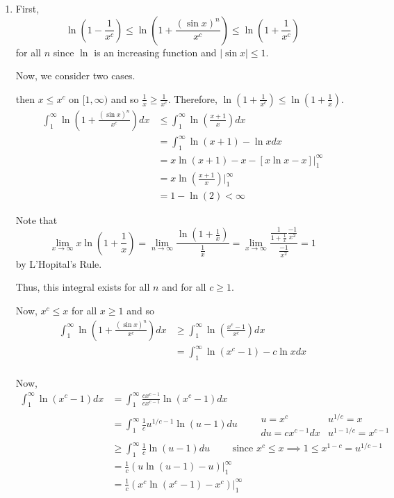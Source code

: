\documentclass[12pt]{Qual}
\begin{document}
\begin{solution}$\,$
\begin{enumerate}[label=(\alph*)]
    \item First, $$\ln\left(1-\frac{1}{x^c}\right)\le \ln\left(1+\frac{(\sin x)^n}{x^c}\right)\le\ln\left(1+\frac{1}{x^c}\right)$$ for all $n$ since $\ln$ is an increasing function and $|\sin x|\le 1$.

    Now, we consider two cases.

     then $x\le x^c$ on $[1,\infty)$ and so $\frac{1}{x}\ge\frac{1}{x^c}$. Therefore, $\ln\left(1+\frac{1}{x^c}\right)\le\ln\left(1+\frac{1}{x}\right)$. \begin{align*}
        \int_1^\infty\ln\left(1+\frac{(\sin x)^n}{x^c}\right)dx&\le\int_1^\infty\ln\left(\frac{x+1}{x}\right)dx\\
        &=\int_1^\infty\ln(x+1)-\ln xdx\\
        &=x\ln(x+1)-x-[x\ln x-x]\bigg|_1^\infty\\
        &=x\ln\left(\frac{x+1}{x}\right)\bigg|_1^\infty\\
        &=1-\ln(2)<\infty
    \end{align*}

    Note that $$\lim_{x\to\infty}x\ln\left(1+\frac{1}{x}\right)=\lim_{n\to\infty}\frac{\ln\left(1+\frac{1}{x}\right)}{\frac{1}{x}}=\lim_{x\to\infty}\frac{\frac{1}{1+\frac{1}{x}}\frac{-1}{x^2}}{\frac{-1}{x^2}}=1$$ by L'Hopital's Rule.

    Thus, this integral exists for all $n$ and for all $c\ge1$.

     Now, $x^c\le x$ for all $x\ge 1$ and so \begin{align*}
        \int_1^\infty\ln\left(1+\frac{(\sin x)^n}{x^c}\right)dx&\ge\int_1^\infty\ln\left(\frac{x^c-1}{x^c}\right)dx\\
        &=\int_1^\infty\ln(x^c-1)-c\ln xdx\\
    \end{align*}

    Now, \begin{align*}
        \int_1^\infty\ln(x^c-1)dx&=\int_1^\infty\frac{cx^{c-1}}{cx^{c-1}}\ln(x^c-1)dx\\
        &=\int_1^\infty \frac{1}{c}u^{1/c-1}\ln(u-1)du\qquad \begin{matrix}
    u=x^c &  u^{1/c}=x\\
    du=cx^{c-1}dx & u^{1-1/c}=x^{c-1}
\end{matrix}\\
        &\ge \int_1^\infty\frac{1}{c}\ln(u-1)du\qquad\text{ since }x^c\le x\implies 1\le x^{1-c}=u^{1/c-1}\\
        &=\frac{1}{c}(u\ln(u-1)-u)\bigg|_1^\infty\\
        &=\frac{1}{c}(x^c\ln(x^c-1)-x^c)\bigg|_1^\infty
\end{align*}


\end{enumerate}
\end{solution}
\end{document}
